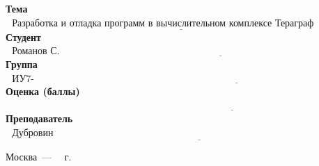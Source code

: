 \begin{titlepage}
	\vspace{1cm}
	
	\noindent\textbf{Тема} $\underline{\text{~~Разработка и отладка программ в вычислительном комплексе Тераграф ~~~~~~~~~~~~~~~~~~~~~~~~~~~~~~~~~~~}}$\newline\newline
	\noindent\textbf{Студент} $\underline{\text{~~Романов С. К.~~~~~~~~~~~~~~~~~~~~~~~~~~~~~~~~~~~~~~~~~~~~~~~~~~~~~~~~~~~~~~~~~~~~~~~~~~~~~~~~~~~~~~~~~~~~~~~~~~~~~~~~~~~~~~~~~~~~~~~~~~~~~~~~~~}}$\newline\newline
	\noindent\textbf{Группа} $\underline{\text{~~ИУ7-55Б~~~~~~~~~~~~~~~~~~~~~~~~~~~~~~~~~~~~~~~~~~~~~~~~~~~~~~~~~~~~~~~~~~~~~~~~~~~~~~~~~~~~~~~~~~~~~~~~~~~~~~~~~~~~~~~~~~~~~~~~~~~~~~~~~~~~~~~~~~}}$\newline\newline
	\noindent\textbf{Оценка (баллы)} $\underline{\text{~~~~~~~~~~~~~~~~~~~~~~~~~~~~~~~~~~~~~~~~~~~~~~~~~~~~~~~~~~~~~~~~~~~~~~~~~~~~~~~~~~~~~~~~~~~~~~~~~~~~~~~~~~~~~~~~~~~~~~~~~~~~~~~~~~~~~~~~~~~~}}$\newline\newline
	\noindent\textbf{Преподаватель} $\underline{\text{~~Дубровин Е.Н.~~~~~~~~~~~~~~~~~~~~~~~~~~~~~~~~~~~~~~~~~~~~~~~~~~~~~~~~~~~~~~~~~~~~~~~~~~~~~~~~~~~~~~~~~~~~~~~~~~~~~~~~~~~~~~~~~~}}$\newline
	
	\begin{center}
		\vfill
		Москва~---~\the\year
		~г.
	\end{center}
	\restoregeometry
\end{titlepage}

